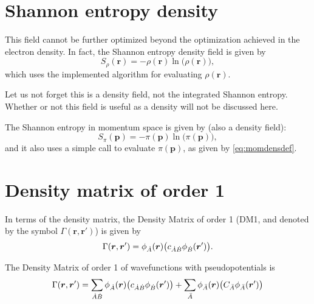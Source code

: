 \section{Shannon entropy density}

This field cannot be further optimized beyond the optimization achieved in the electron density. In fact, the Shannon entropy density field is given by
%
\begin{equation}
   S_{\rho}(\boldsymbol{r})=-\rho(\boldsymbol{r})\ln\big(\rho(\boldsymbol{r})\big),
\end{equation}
%
which uses the implemented algorithm for evaluating $\rho(\boldsymbol{r})$.

Let us not forget this is a density field, not the integrated Shannon entropy. Whether or not this field is useful as a density will not be discussed here.

The Shannon entropy in momentum space is given by (also a density field):
%
\begin{equation}
   S_{\pi}(\boldsymbol{p})=-\pi(\boldsymbol{p})\ln\big(\pi(\boldsymbol{p})\big),
\end{equation}
%
and it also uses a simple call to evaluate $\pi(\boldsymbol{p})$, as given by \ref{eq:momdensdef}.


\section{Density matrix of order 1}

In terms of the density matrix, the Density Matrix of order 1 (DM1, and denoted by the symbol $\Gamma(\boldsymbol{r},\boldsymbol{r}')$) is given by
%
\begin{equation}
   \Gamma(\boldsymbol{r},\boldsymbol{r}')=\phi_{\dot{A}}(\boldsymbol{r})\big(c_{\dot{A}\dot{B}}\phi_{\dot{B}}(\boldsymbol{r}')\big).
\end{equation}
%

The Density Matrix of order 1 of wavefunctions with pseudopotentials is
%
\begin{equation}%
  \Gamma(\boldsymbol{r},\boldsymbol{r}')=\sum_{\dA\dB}
  \phi_{\dA}(\boldsymbol{r})\big(c_{\dA\dB}\phi_{\dB}(\boldsymbol{r}')\big)
  +\sum_{\bA}
  \phi_{\bA}(\boldsymbol{r})\big(C_{\bA}\phi_{\bA}(\boldsymbol{r}')\big)
\end{equation}
%


